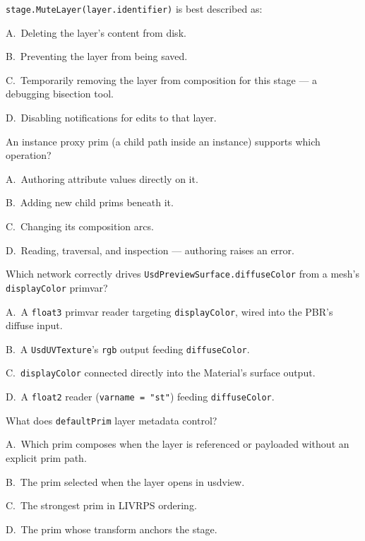 \texttt{stage.MuteLayer(layer.identifier)} is best described as:
\begin{Choices}
  \item A.\ Deleting the layer's content from disk.
  \item B.\ Preventing the layer from being saved.
  \item C.\ Temporarily removing the layer from composition for this stage --- a debugging bisection tool.
  \item D.\ Disabling notifications for edits to that layer.
\end{Choices}

An instance proxy prim (a child path inside an instance) supports which
operation?
\begin{Choices}
  \item A.\ Authoring attribute values directly on it.
  \item B.\ Adding new child prims beneath it.
  \item C.\ Changing its composition arcs.
  \item D.\ Reading, traversal, and inspection --- authoring raises an error.
\end{Choices}

Which network correctly drives \texttt{UsdPreviewSurface.diffuseColor} from
a mesh's \texttt{displayColor} primvar?
\begin{Choices}
  \item A.\ A \texttt{float3} primvar reader targeting
        \texttt{displayColor}, wired into the PBR's diffuse input.
  \item B.\ A \texttt{UsdUVTexture}'s \texttt{rgb} output feeding \texttt{diffuseColor}.
  \item C.\ \texttt{displayColor} connected directly into the Material's surface output.
  \item D.\ A \texttt{float2} reader (\texttt{varname = "st"}) feeding
        \texttt{diffuseColor}.
\end{Choices}

What does \texttt{defaultPrim} layer metadata control?
\begin{Choices}
  \item A.\ Which prim composes when the layer is referenced or payloaded without an explicit prim path.
  \item B.\ The prim selected when the layer opens in usdview.
  \item C.\ The strongest prim in LIVRPS ordering.
  \item D.\ The prim whose transform anchors the stage.
\end{Choices}

